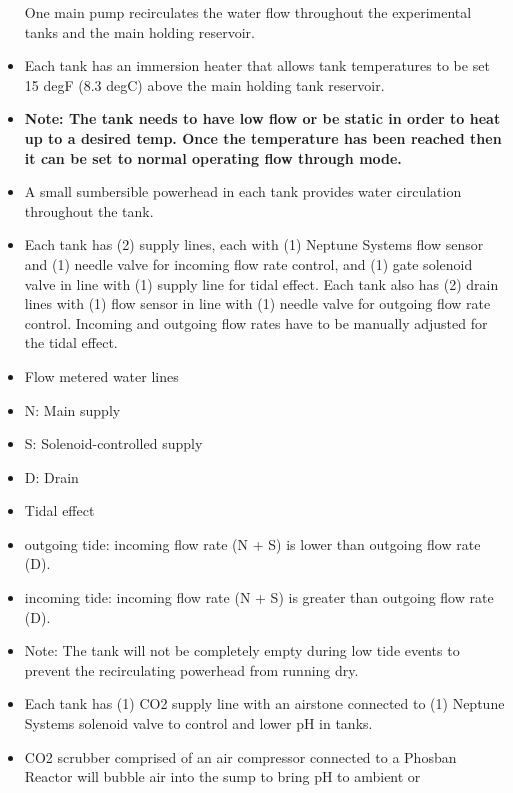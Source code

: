 \documentclass[]{book}
\begin{document}
\begin{itemize}
  One main pump recirculates the water flow throughout the experimental
  tanks and the main holding reservoir.\\
\item
  Each tank has an immersion heater that allows tank temperatures to be
  set 15 degF (8.3 degC) above the main holding tank reservoir.\\
\item
  \textbf{Note: The tank needs to have low flow or be static in order to
  heat up to a desired temp. Once the temperature has been reached then
  it can be set to normal operating flow through mode.}\\
\item
  A small sumbersible powerhead in each tank provides water circulation
  throughout the tank.\\
\item
  Each tank has (2) supply lines, each with (1) Neptune Systems flow
  sensor and (1) needle valve for incoming flow rate control, and (1)
  gate solenoid valve in line with (1) supply line for tidal effect.
  Each tank also has (2) drain lines with (1) flow sensor in line with
  (1) needle valve for outgoing flow rate control. Incoming and outgoing
  flow rates have to be manually adjusted for the tidal effect.\\
\item
  Flow metered water lines
\item
  N: Main supply
\item
  S: Solenoid-controlled supply
\item
  D: Drain
\item
  Tidal effect
\item
  outgoing tide: incoming flow rate (N + S) is lower than outgoing flow
  rate (D).\\
\item
  incoming tide: incoming flow rate (N + S) is greater than outgoing
  flow rate (D).\\
\item
  Note: The tank will not be completely empty during low tide events to
  prevent the recirculating powerhead from running dry.\\
\item
  Each tank has (1) CO2 supply line with an airstone connected to (1)
  Neptune Systems solenoid valve to control and lower pH in tanks.\\
\item
  CO2 scrubber comprised of an air compressor connected to a Phosban
  Reactor will bubble air into the sump to bring pH to ambient or

\end{itemize}
\end{document}
